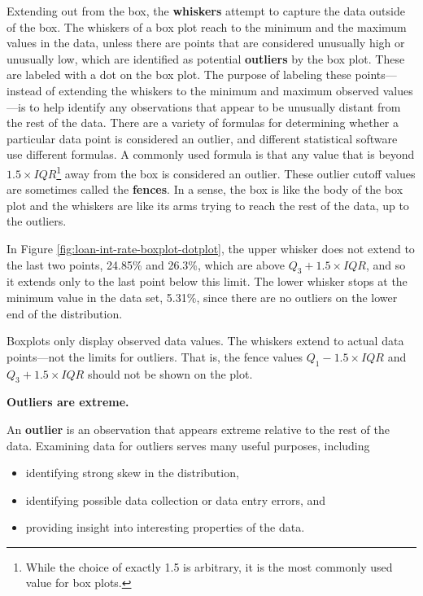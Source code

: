 \documentclass[
  10pt,
  openany]{book}
\providecommand{\tightlist}{%
  \setlength{\itemsep}{0pt}\setlength{\parskip}{0pt}}
\theoremstyle{definition}
\theoremstyle{definition}
\theoremstyle{definition}
\theoremstyle{definition}
\theoremstyle{remark}
\begin{document}
Extending out from the box, the \textbf{whiskers} attempt to capture the data outside of the box.
The whiskers of a box plot reach to the minimum and the maximum values in the data, unless there are points that are considered unusually high or unusually low, which are identified as potential \textbf{outliers} by the box plot.
These are labeled with a dot on the box plot.
The purpose of labeling these points---instead of extending the whiskers to the minimum and maximum observed values---is to help identify any observations that appear to be unusually distant from the rest of the data.
There are a variety of formulas for determining whether a particular data point is considered an outlier, and different statistical software use different formulas.
A commonly used formula is that any value that is beyond \(1.5\times IQR\)\footnote{While the choice of exactly 1.5 is arbitrary, it is the most commonly used value for box plots.} away from the box is considered an outlier. These outlier cutoff values are sometimes called the \textbf{fences}.
In a sense, the box is like the body of the box plot and the whiskers are like its arms trying to reach the rest of the data, up to the outliers.

In Figure \ref{fig:loan-int-rate-boxplot-dotplot},
the upper whisker does not extend to the last two points, 24.85\% and 26.3\%, which are above
\(Q_3 + 1.5\times IQR\), and so it extends only to the last point below this limit.
The lower whisker stops at the minimum value in the data set, 5.31\%, since there are no outliers on the lower end of the distribution.

Boxplots only display observed data values.
The whiskers extend to actual data points---not the limits for outliers. That is,
the fence values \(Q_1 - 1.5\times IQR\) and \(Q_3 + 1.5\times IQR\)
should not be shown on the plot.

\textbf{Outliers are extreme.}

An \textbf{outlier} is an observation that appears extreme relative to the rest of the data.
Examining data for outliers serves many useful purposes, including

\begin{itemize}
\tightlist
\item
  identifying strong skew  in the distribution,
\item
  identifying possible data collection or data entry errors, and
\item
  providing insight into interesting properties of the data.
\end{itemize}
\end{document}
